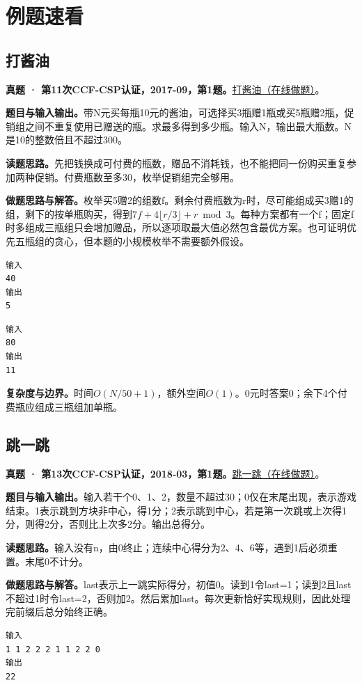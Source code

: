 \section{例题速看}
\subsection{打酱油}
\textbf{真题 · 第11次CCF-CSP认证，2017-09，第1题。}\href{https://www.acwing.com/problem/content/3250/}{打酱油（在线做题）}。

\noindent\textbf{题目与输入输出。}带N元买每瓶10元的酱油，可选择买3瓶赠1瓶或买5瓶赠2瓶，促销组之间不重复使用已赠送的瓶。求最多得到多少瓶。输入N，输出最大瓶数。N是10的整数倍且不超过300。

\noindent\textbf{读题思路。}先把钱换成可付费的瓶数，赠品不消耗钱，也不能把同一份购买重复参加两种促销。付费瓶数至多30，枚举促销组完全够用。

\noindent\textbf{做题思路与解答。}枚举买5赠2的组数f。剩余付费瓶数为r时，尽可能组成买3赠1的组，剩下的按单瓶购买，得到$7f+4\lfloor r/3\rfloor+r\bmod3$。每种方案都有一个f；固定f时多组成三瓶组只会增加赠品，所以逐项取最大值必然包含最优方案。也可证明优先五瓶组的贪心，但本题的小规模枚举不需要额外假设。
\begin{verbatim}
输入
40
输出
5
\end{verbatim}
\begin{verbatim}
输入
80
输出
11
\end{verbatim}

\noindent\textbf{复杂度与边界。}时间$O(N/50+1)$，额外空间$O(1)$。0元时答案0；余下4个付费瓶应组成三瓶组加单瓶。
\subsection{跳一跳}
\textbf{真题 · 第13次CCF-CSP认证，2018-03，第1题。}\href{https://www.acwing.com/problem/content/3260/}{跳一跳（在线做题）}。

\noindent\textbf{题目与输入输出。}输入若干个0、1、2，数量不超过30；0仅在末尾出现，表示游戏结束。1表示跳到方块非中心，得1分；2表示跳到中心，若是第一次跳或上次得1分，则得2分，否则比上次多2分。输出总得分。

\noindent\textbf{读题思路。}输入没有n，由0终止；连续中心得分为2、4、6等，遇到1后必须重置。末尾0不计分。

\noindent\textbf{做题思路与解答。}last表示上一跳实际得分，初值0。读到1令last=1；读到2且last不超过1时令last=2，否则加2。然后累加last。每次更新恰好实现规则，因此处理完前缀后总分始终正确。
\begin{verbatim}
输入
1 1 2 2 2 1 1 2 2 0
输出
22
\end{verbatim}

